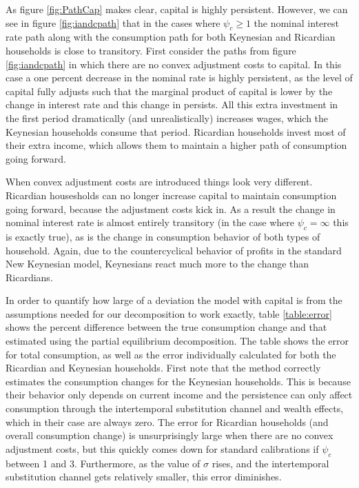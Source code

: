 \documentclass[titlepage]{\econtex}\newcommand{\texname}{ConsumptionHeterogeneity}
\begin{document}
As figure \ref{fig:PathCap} makes clear, capital is highly persistent. However, we can see in figure \ref{fig:iandcpath} that in the cases where $\psi_c \geq 1$ the nominal interest rate path along with the consumption path for both Keynesian and Ricardian households is close to transitory. First consider the paths from figure \ref{fig:iandcpath} in which there are no convex adjustment costs to capital. In this case a one percent decrease in the nominal rate is highly persistent, as the level of capital fully adjusts such that the marginal product of capital is lower by the change in interest rate and this change in persists. All this extra investment in the first period dramatically (and unrealistically) increases wages, which the Keynesian households consume that period. Ricardian households invest most of their extra income, which allows them to maintain a higher path of consumption going forward.

When convex adjustment costs are introduced things look very different. Ricardian housesholds can no longer increase capital to maintain consumption going forward, because the adjustment costs kick in. As a result the change in nominal interest rate is almost entirely transitory (in the case where $\psi_c=\infty$ this is exactly true), as is the change in consumption behavior of both types of household. Again, due to the countercyclical behavior of profits in the standard New Keynesian model, Keynesians react much more to the change than Ricardians.

In order to quantify how large of a deviation the model with capital is from the assumptions needed for our decomposition to work exactly, table \ref{table:error} shows the percent difference between the true consumption change and that estimated using the partial equilibrium decomposition. The table shows the error for total consumption, as well as the error individually calculated for both the Ricardian and Keynesian households. First note that the method correctly estimates the consumption changes for the Keynesian households. This is because their behavior only depends on current income and the persistence can only affect consumption through the intertemporal substitution channel and wealth effects, which in their case are always zero. The error for Ricardian households (and overall consumption change) is unsurprisingly large when there are no convex adjustment costs, but this quickly comes down for standard calibrations if $\psi_c$ between 1 and 3. Furthermore, as the value of $\sigma$ rises, and the intertemporal substitution channel gets relatively smaller, this error diminishes.
\end{document}
